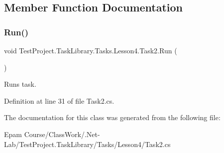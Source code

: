 \subsection{Member Function Documentation}
\mbox{\label{class_test_project_1_1_task_library_1_1_tasks_1_1_lesson4_1_1_task2_a2689e89b69a1bb0563ad9acd5e2c3bda}} 
\subsubsection{\texorpdfstring{Run()}{Run()}}
{\footnotesize\ttfamily void Test\+Project.\+Task\+Library.\+Tasks.\+Lesson4.\+Task2.\+Run (\begin{DoxyParamCaption}{ }\end{DoxyParamCaption})}



Runs task. 



Definition at line 31 of file Task2.\+cs.



The documentation for this class was generated from the following file\+:\begin{DoxyCompactItemize}
\item 
Epam Course/\+Class\+Work/.\+Net-\/\+Lab/\+Test\+Project.\+Task\+Library/\+Tasks/\+Lesson4/Task2.\+cs\end{DoxyCompactItemize}
